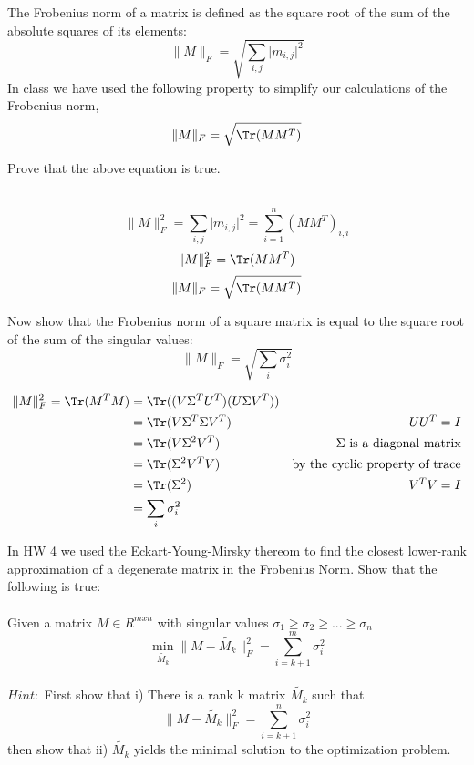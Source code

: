 The Frobenius norm of a matrix is defined as the square root of the sum of the absolute squares of its elements:
$$ \| M \|_F = \sqrt{\sum_{i, j} \lvert m_{i, j} \rvert^2}$$
In class we have used the following property to simplify our calculations of the Frobenius norm,
$$ \| M \|_F = \sqrt{\Tr(M M^T)}$$

\begin{Parts}

\Part
Prove that the above equation is true. \\
\\
\begin{solution}
$$\| M \| _F^2 = \sum_{i, j} \lvert m_{i,j} \rvert^2 = \sum_{i=1}^n (MM^T)_{i, i}$$
$$ \| M \|_F^2 = \Tr(MM^T) $$
$$ \| M \|_F = \sqrt{\Tr(MM^T)} $$
\end{solution}

\Part
Now show that the Frobenius norm of a square matrix is equal to the square root of the sum of the singular values:
$$\|M\|_F = \sqrt{\sum_i \sigma_i^2}$$

\begin{solution}
\begin{align*}
\| M \|_F^2 = \Tr(M^TM) &= \Tr((V\Sigma^T U^T) (U \Sigma V^T)) \\
&= \Tr(V \Sigma^T \Sigma V^T) & UU^T = I \\
&= \Tr(V \Sigma^2 V^T) & \Sigma \text{ is a diagonal matrix}\\
&= \Tr(\Sigma^2 V^T V) &\text{by the cyclic property of trace} \\
&= \Tr(\Sigma^2) & V^T V = I \\
&= \sum_{i} \sigma_i^2
\end{align*}
\end{solution}

\Part
In HW 4 we used the Eckart-Young-Mirsky thereom to find the closest lower-rank approximation of a degenerate matrix in the Frobenius Norm. Show that the following is true:
\\
\\Given a matrix $ M \in R^{mxn} $ with singular values $\sigma_1 \geq \sigma_2 \geq ... \geq \sigma_n$
$$ \min_{\tilde{M_k}} \|M - \tilde{M_k} \|_F^2 = \sum_{i=k+1}^m \sigma_i^2 $$
\\$Hint:$ First show that i) There is a rank k matrix $\tilde{M_k}$ such that 
$$\| M-\tilde{M_k} \|_F^2 = \sum_{i=k+1}^n \sigma_i^2$$
then show that ii) $\tilde{M_k}$ yields the minimal solution to the optimization problem.
\\
\\
\begin{solution}


\end{solution}
\end{Parts}
